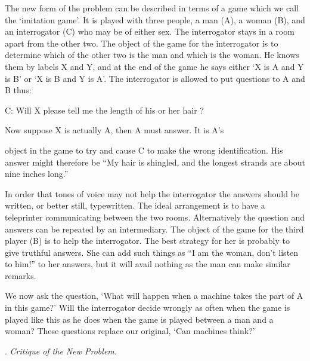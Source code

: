 \documentclass[10pt]{article} %
\newcommand{\dialogueturn}[2]{%
    \noindent\normalfont #1: #2\par %
    \vspace{0.2\baselineskip}%
}
\begin{document}
The new form of the problem can be described in terms of a game which we call the `imitation game'. It is played with three people, a man (A), a woman (B), and an interrogator (C) who may be of either sex. The interrogator stays in a room apart from the other two. The object of the game for the interrogator is to determine which of the other two is the man and which is the woman. He knows them by labels X and Y, and at the end of the game he says either `X is A and Y is B' or `X is B and Y is A'. The interrogator is allowed to put questions to A and B thus:

\vspace{0.5\baselineskip} %
\dialogueturn{C}{Will X please tell me the length of his or her hair ?}%
Now suppose X is actually A, then A must answer. It is A's

object in the game to try and cause C to make the wrong identification. His answer might therefore be
\vspace{0.2\baselineskip} %
``My hair is shingled, and the longest strands are about nine inches long.''\par %
\vspace{0.5\baselineskip} %

In order that tones of voice may not help the interrogator the answers should be written, or better still, typewritten. The ideal arrangement is to have a teleprinter communicating between the two rooms. Alternatively the question and answers can be repeated by an intermediary. The object of the game for the third player (B) is to help the interrogator. The best strategy for her is probably to give truthful answers. She can add such things as ``I am the woman, don't listen to him!'' to her answers, but it will avail nothing as the man can make similar remarks.

We now ask the question, `What will happen when a machine takes the part of A in this game?' Will the interrogator decide wrongly as often when the game is played like this as he does when the game is played between a man and a woman? These questions replace our original, `Can machines think?'

\vspace{0.5\baselineskip} %
\noindent{}. \textit{Critique of the New Problem.}
\vspace{0.5\baselineskip} %
\end{document}
